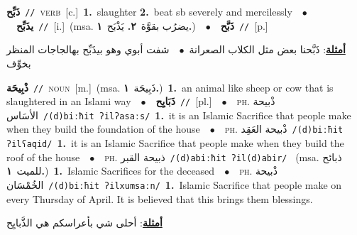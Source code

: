 \documentclass[10pt,a4paper,twoside]{article} %
\begin{document}
\begin{multicols}{2}
{\setlength\topsep{0pt}\textbf{\foreignlanguage{arabic}{ذَبِّح}}\ {\color{gray}\texttt{//}\color{black}}\ \textsc{verb}\ [c.]\ \textbf{1.}~slaughter  \textbf{2.}~beat sb severely and mercilessly\ \ $\bullet$\ \ \setlength\topsep{0pt}\textbf{\foreignlanguage{arabic}{يذَبِّح}}\ {\color{gray}\texttt{//}\color{black}}\ [i.]\ \color{gray}(msa. \foreignlanguage{arabic}{يضرُب بقوَّة}~\foreignlanguage{arabic}{\textbf{٢.}}  \foreignlanguage{arabic}{يَذْبَح}~\foreignlanguage{arabic}{\textbf{١.}})\color{black}\ \ $\bullet$\ \ \setlength\topsep{0pt}\textbf{\foreignlanguage{arabic}{ذَبَّح}}\ {\color{gray}\texttt{//}\color{black}}\ [p.]\  \begin{flushright}\color{gray}\foreignlanguage{arabic}{\textbf{\underline{\foreignlanguage{arabic}{أمثلة}}}: ذَبَّحنا بعض مثل الكلاب الصعرانة\ $\bullet$\ \  شفت أبوي وهو بيذَبِّح بهالجاجات المنظر بخوِّف}\end{flushright}\color{black}} \vspace{2mm}

{\setlength\topsep{0pt}\textbf{\foreignlanguage{arabic}{ذْبِيحَة}}\ {\color{gray}\texttt{//}\color{black}}\ \textsc{noun}\ [m.]\ \color{gray}(msa. \foreignlanguage{arabic}{ذَبِيحَة}~\foreignlanguage{arabic}{\textbf{١.}})\color{black}\ \textbf{1.}~an animal like sheep or cow that is slaughtered in an Islami way\ \ $\bullet$\ \ \setlength\topsep{0pt}\textbf{\foreignlanguage{arabic}{ذَبَايِح}}\ {\color{gray}\texttt{//}\color{black}}\ [pl.]\ \ $\bullet$\ \ \textsc{ph.} \color{gray} \foreignlanguage{arabic}{ذْبيحة الأسَاس}\color{black}\ {\color{gray}\texttt{/{\sffamily (d)biːħit ʔilʔasaːs}/}\color{black}}\ \textbf{1.}~it is an Islamic Sacrifice that people make when they build the foundation of the house\ \ $\bullet$\ \ \textsc{ph.} \color{gray} \foreignlanguage{arabic}{ذْبيحة العَقِد}\color{black}\ {\color{gray}\texttt{/{\sffamily (d)biːħit ʔilʕaqid}/}\color{black}}\ \textbf{1.}~it is an Islamic Sacrifice that people make when they build the roof of the house\ \ $\bullet$\ \ \textsc{ph.} \color{gray} \foreignlanguage{arabic}{ذبيحة القبر}\color{black}\ {\color{gray}\texttt{/{\sffamily (d)abiːħit ʔil(d)abir}/}\color{black}}\ \color{gray} (msa. \foreignlanguage{arabic}{ذبائح للميت}~\foreignlanguage{arabic}{\textbf{١.}})\color{black}\ \textbf{1.}~Islamic Sacrifices for the deceased\ \ $\bullet$\ \ \textsc{ph.} \color{gray} \foreignlanguage{arabic}{ذْبيحة الخُمْسَان}\color{black}\ {\color{gray}\texttt{/{\sffamily (d)biːħit ʔilxumsaːn}/}\color{black}}\ \textbf{1.}~Islamic Sacrifice that people make on every Thursday of April. It is believed that this brings them blessings.\  \begin{flushright}\color{gray}\foreignlanguage{arabic}{\textbf{\underline{\foreignlanguage{arabic}{أمثلة}}}: أحلى شي بأعراسكم هي الذَّبايِح}\end{flushright}\color{black}} \vspace{2mm}


\end{multicols}
\end{document}
